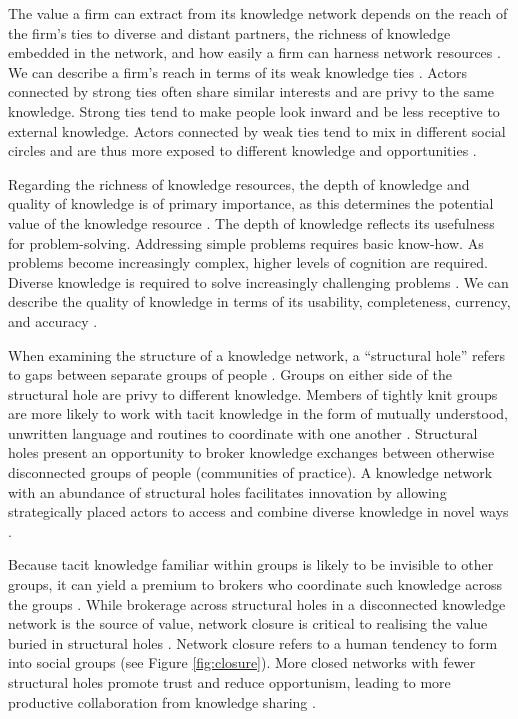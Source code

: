 The value a firm can extract from its knowledge network depends on the reach of the firm's ties to diverse and distant partners, the richness of knowledge embedded in the network, and how easily a firm can harness network resources \citep{gulati2011networks,chesbrough2018value}. We can describe a firm's reach in terms of its weak knowledge ties \citep{granovetter1973strength,hansen1999search}. Actors connected by strong ties often share similar interests and are privy to the same knowledge. Strong ties tend to make people look inward and be less receptive to external knowledge. Actors connected by weak ties tend to mix in different social circles and are thus more exposed to different knowledge and opportunities \citep{granovetter1973strength}. \medskip

Regarding the richness of knowledge resources, the depth of knowledge and quality of knowledge is of primary importance, as this determines the potential value of the knowledge resource \citep{davenport1998working,kane2005knowledge,chesbrough2018value}. The depth of knowledge reflects its usefulness for problem-solving. Addressing simple problems requires basic know-how. As problems become increasingly complex, higher levels of cognition are required. Diverse knowledge is required to solve increasingly challenging problems \citep{webb2002depth,bennet2008depth,jeppesen2010marginality}. We can describe the quality of knowledge in terms of its usability, completeness, currency, and accuracy \citep{wixom2005theoretical}. \medskip

When examining the structure of a knowledge network, a \enquote{structural hole} refers to gaps between separate groups of people \citep{burt2000network}. Groups on either side of the structural hole are privy to different knowledge. Members of tightly knit groups are more likely to work with tacit knowledge in the form of mutually understood, unwritten language and routines to coordinate with one another \citep{burt2007secondhand}. Structural holes present an opportunity to broker knowledge exchanges between otherwise disconnected groups of people (communities of practice). A knowledge network with an abundance of structural holes facilitates innovation by allowing strategically placed actors to access and combine diverse knowledge in novel ways \citep{burt2004structural,sparrowe2011publishing}. \medskip

Because tacit knowledge familiar within groups is likely to be invisible to other groups, it can yield a premium to brokers who coordinate such knowledge across the groups \citep{burt2007secondhand}. While brokerage across structural holes in a disconnected knowledge network is the source of value, network closure is critical to realising the value buried in structural holes \citep{burt2004structural,rost2011strength}. Network closure refers to a human tendency to form into social groups (see Figure \ref{fig:closure}). More closed networks with fewer structural holes promote trust and reduce opportunism, leading to more productive collaboration from knowledge sharing \citep{ahuja2000collaboration, burt2007secondhand}. \medskip

